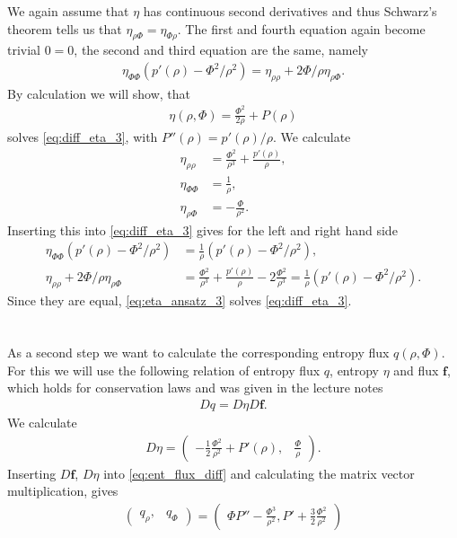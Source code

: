 We again assume that $\eta$ has continuous second derivatives and thus Schwarz's theorem tells us that $\eta_{\rho\Phi}=\eta_{\Phi\rho}$. The first and fourth equation again become trivial $0=0$, the second and third equation are the same, namely
\begin{align}
\eta_{\Phi\Phi}(p'(\rho)-\Phi^2/\rho^2) = \eta_{\rho\rho} +2\Phi/\rho \eta_{\rho \Phi}.\label{eq:diff_eta_3}
\end{align}
By calculation we will show, that 
\begin{align}
\eta(\rho,\Phi)= \frac {\Phi^2}{2\rho} +P(\rho) \label{eq:eta_ansatz_3}
\end{align}
solves \cref{eq:diff_eta_3}, with $P''(\rho)=p'(\rho)/\rho$. We calculate
\begin{align}
\eta_{\rho\rho}&=\frac{\Phi^2}{\rho^3}+\frac{p'(\rho)}{\rho},\\
\eta_{\Phi\Phi}&=\frac 1\rho,\\
\eta_{\rho\Phi}&=-\frac{\Phi}{\rho^2}.
\end{align}
Inserting this into \cref{eq:diff_eta_3} gives for the left and right hand side
\begin{align}
\eta_{\Phi\Phi}(p'(\rho)-\Phi^2/\rho^2)&=\frac 1\rho(p'(\rho)-\Phi^2/\rho^2),\\
 \eta_{\rho\rho} +2\Phi/\rho \eta_{\rho \Phi}& = \frac{\Phi^2}{\rho^3}+\frac{p'(\rho)}{\rho} -2\frac{\Phi^2}{\rho^3} = \frac 1\rho(p'(\rho)-\Phi^2/\rho^2).
\end{align}
Since they are equal, \cref{eq:eta_ansatz_3} solves \cref{eq:diff_eta_3}. \\ \\ \\
As a second step we want to calculate the corresponding entropy flux $ q(\rho,\Phi)$.
For this we will use the following relation of entropy flux $q$, entropy $\eta$ and flux $\bm f$, which holds for conservation laws and was given in the lecture notes
\begin{align}
D q = D\eta D\bm f.\label{eq:ent_flux_diff}
\end{align}
We calculate
\begin{align}
D\eta = \begin{pmatrix}
-\frac 12 \frac{\Phi^2}{\rho^2} +P'(\rho), &
\frac{\Phi}{\rho}
\end{pmatrix}.
\end{align}
Inserting $D\bm f$, $D\eta$ into \cref{eq:ent_flux_diff} and calculating the matrix vector multiplication, gives
\begin{align}
\begin{pmatrix}
q_\rho ,& q_\Phi 
\end{pmatrix}
=\begin{pmatrix}
\Phi P'' -\frac{\Phi^3}{\rho^2}, P' +\frac 32 \frac{\Phi^2}{\rho^2}
\end{pmatrix}\label{eq:der_q}
\end{align}
